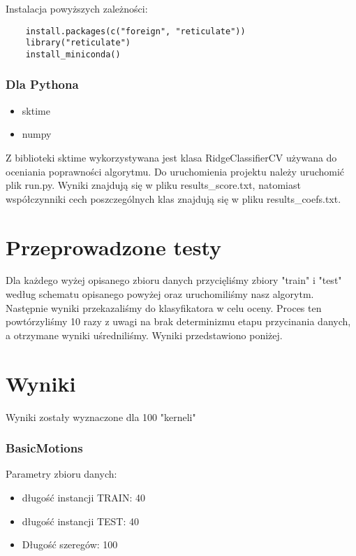 \documentclass[12pt]{article}
\begin{document}
Instalacja powyższych zależności:
\begin{verbatim}
    install.packages(c("foreign", "reticulate"))
    library("reticulate")
    install_miniconda()
\end{verbatim}

\subsubsection*{Dla Pythona}
\begin{itemize}
  \item sktime
  \item numpy
\end{itemize}

Z biblioteki sktime wykorzystywana jest klasa RidgeClassifierCV używana do oceniania poprawności algorytmu. Do uruchomienia projektu należy uruchomić plik run.py. Wyniki znajdują się w pliku results\_score.txt, natomiast współczynniki cech poszczególnych klas znajdują się w pliku results\_coefs.txt.

\section{Przeprowadzone testy}

Dla każdego wyżej opisanego zbioru danych przycięliśmy zbiory "train" i "test" według schematu opisanego powyżej oraz uruchomiliśmy nasz algorytm. Następnie wyniki przekazaliśmy do klasyfikatora w celu oceny. Proces ten powtórzyliśmy 10 razy z uwagi na brak determinizmu etapu przycinania danych, a otrzymane wyniki uśredniliśmy. Wyniki przedstawiono poniżej.

\section{Wyniki}
Wyniki zostały wyznaczone dla 100 "kerneli"

\subsubsection*{BasicMotions}
Parametry zbioru danych:
\begin{itemize}
  \item długość instancji TRAIN: 40
  \item długość instancji TEST: 40
  \item Długość szeregów: 100
\end{itemize}
\end{document}
